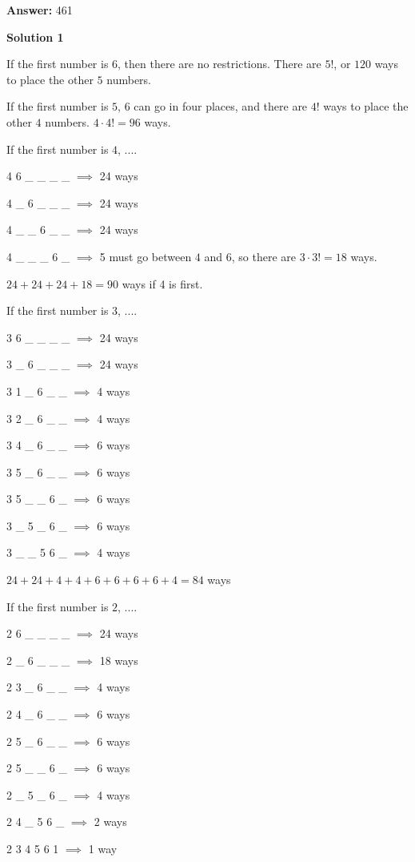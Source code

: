\begin{enumerate}
 
 \textbf{Answer: }461



\textbf{Solution 1}

If the first number is $6$, then there are no restrictions. There are $5!$, or $120$ ways to place the other $5$ numbers.

 
If the first number is $5$, $6$ can go in four places, and there are $4!$ ways to place the other $4$ numbers. $4 \cdot 4! = 96$ ways.

 
If the first number is $4$, ....

 4 6 \_ \_ \_ \_ $\implies$ 24 ways

 4 \_ 6 \_ \_ \_ $\implies$ 24 ways

 4 \_ \_ 6 \_ \_ $\implies$ 24 ways

 4 \_ \_ \_ 6 \_ $\implies$ 5 must go between $4$ and $6$, so there are $3 \cdot 3! = 18$ ways.

 $24 + 24 + 24 + 18 = 90$ ways if 4 is first.

 
If the first number is $3$, ....

 3 6 \_ \_ \_ \_ $\implies$ 24 ways

 3 \_ 6 \_ \_ \_ $\implies$ 24 ways

 3 1 \_ 6 \_ \_ $\implies$ 4 ways 

 3 2 \_ 6 \_ \_ $\implies$ 4 ways

 3 4 \_ 6 \_ \_ $\implies$ 6 ways

 3 5 \_ 6 \_ \_ $\implies$ 6 ways

 3 5 \_ \_ 6 \_ $\implies$ 6 ways

 3 \_ 5 \_ 6 \_ $\implies$ 6 ways

 3 \_ \_ 5 6 \_ $\implies$ 4 ways

 $24 + 24 + 4 + 4 + 6 + 6 + 6 + 6 + 4 = 84$ ways

 
If the first number is $2$, ....

 2 6 \_ \_ \_ \_ $\implies$ 24 ways

 2 \_ 6 \_ \_ \_ $\implies$ 18 ways 

 2 3 \_ 6 \_ \_ $\implies$ 4 ways

 2 4 \_ 6 \_ \_ $\implies$ 6 ways

 2 5 \_ 6 \_ \_ $\implies$ 6 ways

 2 5 \_ \_ 6 \_ $\implies$ 6 ways

 2 \_ 5 \_ 6 \_ $\implies$ 4 ways

 2 4 \_ 5 6 \_ $\implies$ 2 ways

 2 3 4 5 6 1 $\implies$ 1 way


\end{enumerate}
